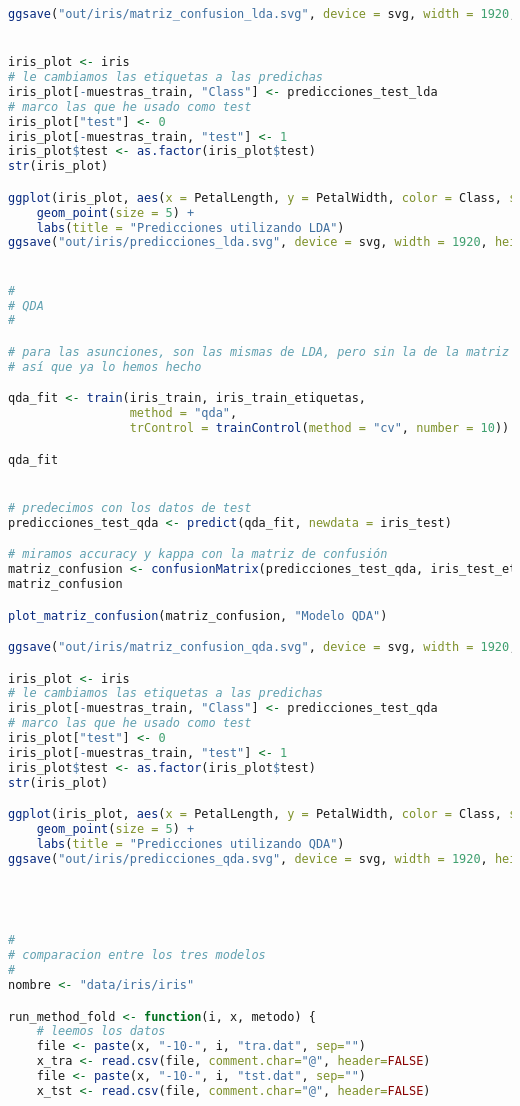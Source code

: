 \begin{lstlisting}[language=R]
ggsave("out/iris/matriz_confusion_lda.svg", device = svg, width = 1920, height = 1080, units = "px", dpi = 150)


iris_plot <- iris
# le cambiamos las etiquetas a las predichas
iris_plot[-muestras_train, "Class"] <- predicciones_test_lda
# marco las que he usado como test
iris_plot["test"] <- 0
iris_plot[-muestras_train, "test"] <- 1
iris_plot$test <- as.factor(iris_plot$test)
str(iris_plot)

ggplot(iris_plot, aes(x = PetalLength, y = PetalWidth, color = Class, shape = test)) +
	geom_point(size = 5) +
	labs(title = "Predicciones utilizando LDA")
ggsave("out/iris/predicciones_lda.svg", device = svg, width = 1920, height = 1080, units = "px", dpi = 150)


#
# QDA
#

# para las asunciones, son las mismas de LDA, pero sin la de la matriz de covarianza
# así que ya lo hemos hecho

qda_fit <- train(iris_train, iris_train_etiquetas,
				 method = "qda",
				 trControl = trainControl(method = "cv", number = 10))

qda_fit


# predecimos con los datos de test
predicciones_test_qda <- predict(qda_fit, newdata = iris_test)

# miramos accuracy y kappa con la matriz de confusión
matriz_confusion <- confusionMatrix(predicciones_test_qda, iris_test_etiquetas)
matriz_confusion

plot_matriz_confusion(matriz_confusion, "Modelo QDA")

ggsave("out/iris/matriz_confusion_qda.svg", device = svg, width = 1920, height = 1080, units = "px", dpi = 150)

iris_plot <- iris
# le cambiamos las etiquetas a las predichas
iris_plot[-muestras_train, "Class"] <- predicciones_test_qda
# marco las que he usado como test
iris_plot["test"] <- 0
iris_plot[-muestras_train, "test"] <- 1
iris_plot$test <- as.factor(iris_plot$test)
str(iris_plot)

ggplot(iris_plot, aes(x = PetalLength, y = PetalWidth, color = Class, shape = test)) +
	geom_point(size = 5) +
	labs(title = "Predicciones utilizando QDA")
ggsave("out/iris/predicciones_qda.svg", device = svg, width = 1920, height = 1080, units = "px", dpi = 150)




#
# comparacion entre los tres modelos
#
nombre <- "data/iris/iris"

run_method_fold <- function(i, x, metodo) {
	# leemos los datos
	file <- paste(x, "-10-", i, "tra.dat", sep="")
	x_tra <- read.csv(file, comment.char="@", header=FALSE)
	file <- paste(x, "-10-", i, "tst.dat", sep="")
	x_tst <- read.csv(file, comment.char="@", header=FALSE)


\end{lstlisting}
